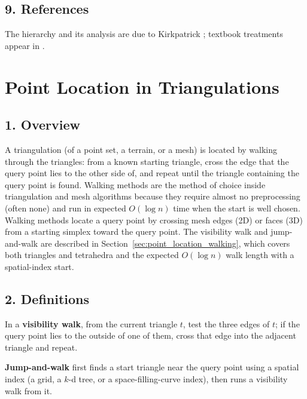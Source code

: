 \subsection{9. References}

The hierarchy and its analysis are due to Kirkpatrick \cite{kirkpatrick1983};
textbook treatments appear in \cite{berg2008,preparata1985}.

\section{Point Location in Triangulations}
\label{sec:pointloc_triangulations}

\subsection{1. Overview}

A triangulation (of a point set, a terrain, or a mesh) is located by
walking through the triangles: from a known starting triangle, cross the
edge that the query point lies to the other side of, and repeat until the
triangle containing the query point is found. Walking methods are the
method of choice inside triangulation and mesh algorithms because they
require almost no preprocessing (often none) and run in expected $O(\log n)$
time when the start is well chosen. Walking methods locate a query point by
crossing mesh edges (2D) or faces (3D) from a starting simplex toward the
query point. The visibility walk and jump-and-walk are described in
Section~\ref{sec:point_location_walking}, which covers both triangles and
tetrahedra and the expected $O(\log n)$ walk length with a spatial-index
start.

\subsection{2. Definitions}

\begin{definition}\label{def:pointloc_visibility_walk}
  In a \textbf{visibility walk}, from the current triangle $t$, test the
  three edges of $t$; if the query point lies to the outside of one of
  them, cross that edge into the adjacent triangle and repeat.
\end{definition}

\begin{definition}\label{def:pointloc_jump_walk}
  \textbf{Jump-and-walk} first finds a start triangle near the query point
  using a spatial index (a grid, a $k$-d tree, or a
  space-filling-curve index), then runs a visibility walk from it.
\end{definition}

